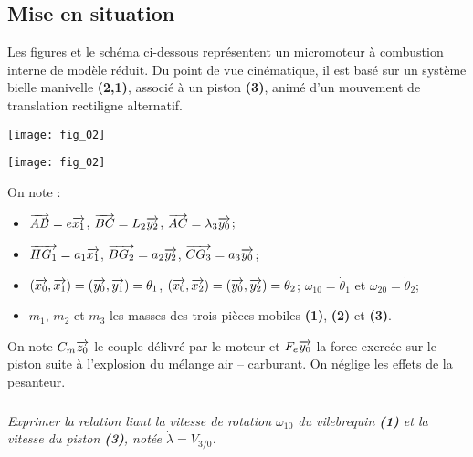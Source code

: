 \documentclass[10pt,fleqn]{article} %
\begin{document}
\def\pathfig{images}

\vspace{5cm}
\pagestyle{fancy}
\thispagestyle{plain}

\def\columnseprulecolor{\color{ocre}}
\setlength{\columnseprule}{0.4pt} 

\def\pathfig{images}

\ifprof
\else
\begin{multicols}{2}
\fi

\subsection*{Mise en situation}
Les figures et le schéma ci-dessous représentent un micromoteur à combustion interne de modèle réduit. Du point de vue cinématique, il est basé sur un système bielle manivelle \textbf{(2,1)}, associé à un piston \textbf{(3)}, animé d’un mouvement de translation rectiligne alternatif. 
\ifprof
\begin{center}
\texttt{[image: fig\_02]}
\end{center}
\else
\begin{center}
\texttt{[image: fig\_02]}
\end{center}
\fi
On note : 
\begin{itemize}
\item $\overrightarrow{AB}=e\overrightarrow{x_1}$, $\overrightarrow{BC}=L_2\overrightarrow{y_2}$, $\overrightarrow{AC}=\lambda_3\overrightarrow{y_0}$;
\item $\overrightarrow{HG_1}=a_1\overrightarrow{x_1}$, $\overrightarrow{BG_2}=a_2\overrightarrow{y_2}$, $\overrightarrow{CG_3}=a_3\overrightarrow{y_0}$;
\item $\left(\overrightarrow{x_0},\overrightarrow{x_1}\right)=\left(\overrightarrow{y_0},\overrightarrow{y_1}\right)=\theta_1$, $\left(\overrightarrow{x_0},\overrightarrow{x_2}\right)=\left(\overrightarrow{y_0},\overrightarrow{y_2}\right)=\theta_2$; $\omega_{10}=\dot{\theta}_1$ et $\omega_{20}=\dot{\theta}_2$;
\item $m_1$, $m_2$ et $m_3$ les masses des trois pièces mobiles \textbf{(1)}, \textbf{(2)} et \textbf{(3)}.
\end{itemize}

On note $C_m \overrightarrow{z_0}$ le couple délivré par le moteur et $F_e \overrightarrow{y_0}$ la force exercée sur le piston suite à l'explosion du mélange air -- carburant. On néglige les effets de la pesanteur.

\subparagraph{}
\textit{Exprimer la relation liant la vitesse de rotation $\omega_{10}$ du vilebrequin \textbf{(1)} et la vitesse du piston \textbf{(3)}, notée $\dot{\lambda}=V_{3/0}$.}%


\end{multicols}
\end{document}

